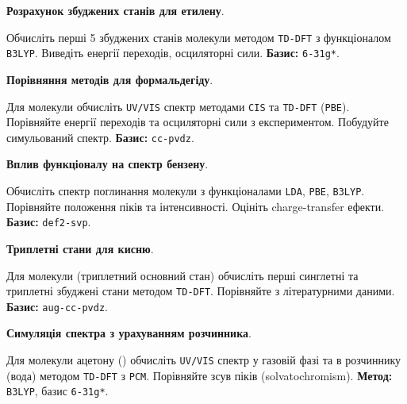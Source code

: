 \begin{tasks}

    \item \textbf{Розрахунок збуджених станів для етилену}.

    Обчисліть перші 5 збуджених станів молекули  методом \texttt{TD-DFT} з функціоналом \texttt{B3LYP}. Виведіть енергії переходів, осциляторні сили.
    \textbf{Базис:} \texttt{6-31g*}.

    \item \textbf{Порівняння методів для формальдегіду}.

    Для молекули  обчисліть \texttt{UV/VIS} спектр методами \texttt{CIS} та \texttt{TD-DFT} (\texttt{PBE}). Порівняйте енергії переходів та осциляторні сили з експериментом. Побудуйте симульований спектр.
    \textbf{Базис:} \texttt{cc-pvdz}.

    \item \textbf{Вплив функціоналу на спектр бензену}.

    Обчисліть спектр поглинання молекули  з функціоналами \texttt{LDA}, \texttt{PBE}, \texttt{B3LYP}. Порівняйте положення піків та інтенсивності. Оцініть charge-transfer ефекти.
    \textbf{Базис:} \texttt{def2-svp}.

    \item \textbf{Триплетні стани для кисню}.

    Для молекули  (триплетний основний стан) обчисліть перші синглетні та триплетні збуджені стани методом \texttt{TD-DFT}. Порівняйте з літературними даними.
    \textbf{Базис:} \texttt{aug-cc-pvdz}.

    \item \textbf{Симуляція спектра з урахуванням розчинника}.

    Для молекули ацетону () обчисліть \texttt{UV/VIS} спектр у газовій фазі та в розчиннику (вода) методом \texttt{TD-DFT} з \texttt{PCM}. Порівняйте зсув піків (solvatochromism).
    \textbf{Метод:} \texttt{B3LYP}, базис \texttt{6-31g*}.
\end{tasks}

